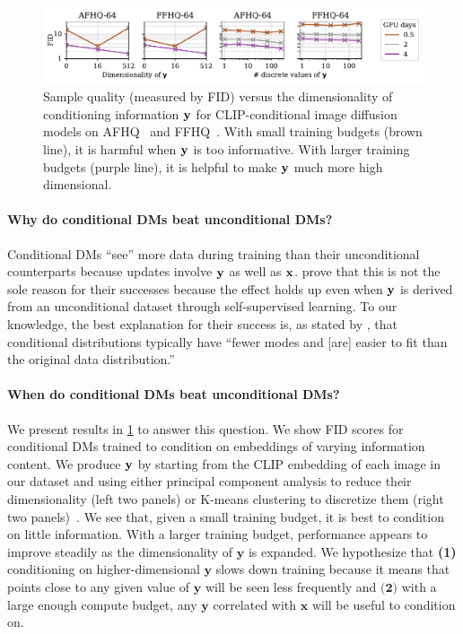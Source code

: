 \begin{figure}[t]
    \centering
    \includegraphics[width=\textwidth]{figs/2sdm/cond-results-vs-nclusters.pdf}
    \caption{Sample quality (measured by FID) versus the dimensionality of conditioning information ${\mathbf{y}}$ for CLIP-conditional image diffusion models on AFHQ~\citep{choi2020stargan} and FFHQ~\citep{karras2018style}. With small training budgets (brown line), it is harmful when ${\mathbf{y}}$ is too informative. With larger training budgets (purple line), it is helpful to make ${\mathbf{y}}$ much more high dimensional.}
    \label{fig:fid-vs-ncomp}
\end{figure}

\paragraph{Why do conditional DMs beat unconditional DMs?}

Conditional DMs ``see'' more data during training than their unconditional counterparts because updates involve ${\mathbf{y}}$ as well as ${\mathbf{x}}$. \citet{bao2022conditional,hu2022self} prove that this is not the sole reason for their successes because the effect holds up even when ${\mathbf{y}}$ is derived from an unconditional dataset through self-supervised learning.
%
To our knowledge, the best explanation for their success is, as stated by \citet{bao2022conditional}, that conditional distributions typically have ``fewer modes and [are] easier to fit than the original data distribution.''

\paragraph{When do conditional DMs beat unconditional DMs?}
%
We present results in \cref{fig:fid-vs-ncomp} to answer this question. We show FID scores for conditional DMs trained to condition on embeddings of varying information content. 
%
We produce ${\mathbf{y}}$ by starting from the CLIP embedding of each image in our dataset and using either principal component analysis to reduce their dimensionality (left two panels) or K-means clustering to discretize them (right two panels)~\citep{hu2022self}.
%
We see that, given a small training budget, it is best to condition on little information. With a larger training budget, performance appears to improve steadily as the dimensionality of $\mathbf{y}$ is expanded. We hypothesize that \textbf{(1)} conditioning on higher-dimensional $\mathbf{y}$ slows down training because it means that points close to any given value of $\mathbf{y}$ will be seen less frequently and $\textbf{(2)}$ with a large enough compute budget, any $\mathbf{y}$ correlated with $\mathbf{x}$ will be useful to condition on.



